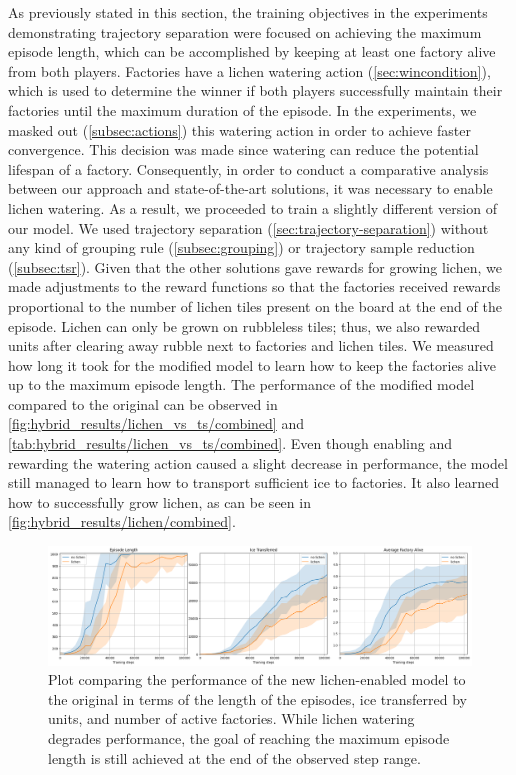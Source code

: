 \noindent As previously stated in this section, the training objectives in the experiments demonstrating trajectory separation were focused on achieving the maximum episode length, which can be accomplished by keeping at least one factory alive from both players. Factories have a lichen watering action (\autoref{sec:wincondition}), which is used to determine the winner if both players successfully maintain their factories until the maximum duration of the episode. In the experiments, we masked out (\autoref{subsec:actions}) this watering action in order to achieve faster convergence. This decision was made since watering can reduce the potential lifespan of a factory. Consequently, in order to conduct a comparative analysis between our approach and state-of-the-art solutions, it was necessary to enable lichen watering. As a result, we proceeded to train a slightly different version of our model. We used trajectory separation (\autoref{sec:trajectory-separation}) without any kind of grouping rule (\autoref{subsec:grouping}) or trajectory sample reduction (\autoref{subsec:tsr}). Given that the other solutions gave rewards for growing lichen, we made adjustments to the reward functions so that the factories received rewards proportional to the number of lichen tiles present on the board at the end of the episode. Lichen can only be grown on rubbleless tiles; thus, we also rewarded units after clearing away rubble next to factories and lichen tiles. We measured how long it took for the modified model to learn how to keep the factories alive up to the maximum episode length. The performance of the modified model compared to the original can be observed in \autoref{fig:hybrid_results/lichen_vs_ts/combined} and \autoref{tab:hybrid_results/lichen_vs_ts/combined}. Even though enabling and rewarding the watering action caused a slight decrease in performance, the model still managed to learn how to transport sufficient ice to factories. It also learned how to successfully grow lichen, as can be seen in \autoref{fig:hybrid_results/lichen/combined}.

\begin{figure}[htbp]
    \centering
    \includegraphics[width=1\linewidth]{images/results_hybrid/lichen_vs_ts/combined.png}
    \captionsetup{justification=justified, singlelinecheck=false, width=1\linewidth, labelfont=bf} 
    \caption[]{Plot comparing the performance of the new lichen-enabled model to the original in terms of the length of the episodes, ice transferred by units, and number of active factories. While lichen watering degrades performance, the goal of reaching the maximum episode length is still achieved at the end of the observed step range.}
    \label{fig:hybrid_results/lichen_vs_ts/combined}
\end{figure}

